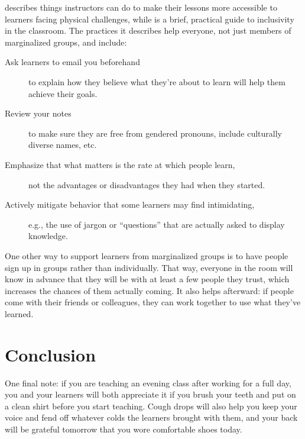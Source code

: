 \documentclass[10pt,letterpaper]{article}
\begin{document}
\cite{Burg2015} describes things instructors can do to make their lessons more accessible
to learners facing physical challenges,
while \cite{Lee2017} is a brief, practical guide to inclusivity in the classroom.
The practices it describes help everyone,
not just members of marginalized groups,
and include:

\begin{description}

\item[Ask learners to email you beforehand]
  to explain how they believe what they're about to learn will help them achieve their goals.

\item[Review your notes]
  to make sure they are free from gendered pronouns, include culturally diverse names, etc.

\item[Emphasize that what matters is the rate at which people learn,]
  not the advantages or disadvantages they had when they started.

\item[Actively mitigate behavior that some learners may find intimidating,]
  e.g., the use of jargon or ``questions'' that are actually asked to display knowledge.

\end{description}

One other way to support learners from marginalized groups is
to have people sign up in groups rather than individually.
That way,
everyone in the room will know in advance that they will be with at least a few people they trust,
which increases the chances of them actually coming.
It also helps afterward:
if people come with their friends or colleagues,
they can work together to use what they've learned.

\section*{Conclusion}

One final note:
if you are teaching an evening class after working for a full day,
you and your learners will both appreciate it if you brush your teeth and put on a clean shirt
before you start teaching.
Cough drops will also help you keep your voice
and fend off whatever colds the learners brought with them,
and your back will be grateful tomorrow that you wore comfortable shoes today.


\end{document}
